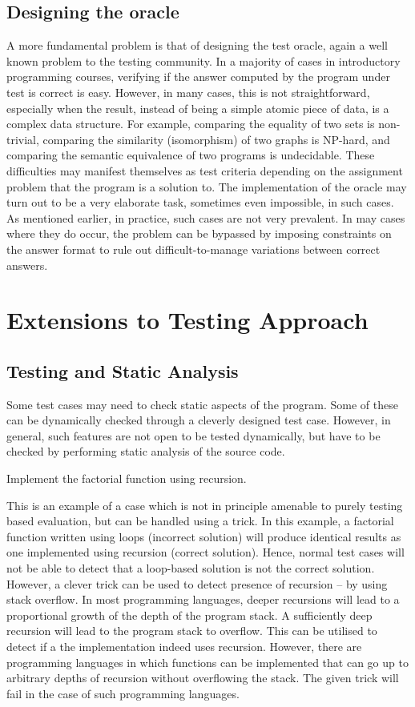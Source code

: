 \documentclass[12pt]{article}
\begin{document}
\subsection{Designing the oracle}
A more fundamental problem is that of designing the test oracle, again a well known problem to the testing community. In a majority of cases in introductory programming courses, verifying if the answer computed by the program under test is correct is easy. However, in many cases, this is not straightforward, especially when the result, instead of being a simple atomic piece of data, is a complex data structure. For example, comparing the equality of two sets is non-trivial, comparing the similarity (isomorphism) of two graphs is NP-hard, and comparing the semantic equivalence of two programs is undecidable. These difficulties may manifest themselves as test criteria depending on the assignment problem that the program is a solution to. The implementation of the oracle may turn out to be a very elaborate task, sometimes even impossible, in such cases. As mentioned earlier, in practice, such cases are not very prevalent. In may cases where they do occur, the problem can be bypassed by imposing constraints on the answer format to rule out difficult-to-manage variations between correct answers.

\section{Extensions to Testing Approach}
\subsection{Testing and Static Analysis} \label{s:tsa}
Some test cases may need to check static aspects of the program. Some of these can be dynamically checked through a cleverly designed test case. However, in general, such features are not open to be tested dynamically, but have to be checked by performing static analysis\cite{Aho:2006:CPT:1177220} of the source code.

\begin{mdframed}[frametitle=Example 1]
Implement the factorial function using recursion.
\end{mdframed}

This is an example of a case which is not in principle amenable to purely testing based evaluation, but can be handled using a trick. In this example, a factorial function written using loops (incorrect solution) will produce identical results as one implemented using recursion (correct solution). Hence, normal test cases will not be able to detect that a loop-based solution is not the correct solution. However, a clever trick can be used to detect presence of recursion -- by using stack overflow. In most programming languages, deeper recursions will lead to a proportional growth of the depth of the program stack. A sufficiently deep recursion will lead to the program stack to overflow. This can be utilised to detect if a the implementation indeed uses recursion. However, there are programming languages in which functions can be implemented that can go up to arbitrary depths of recursion without overflowing the stack. The given trick will fail in the case of such programming languages.
\end{document}
